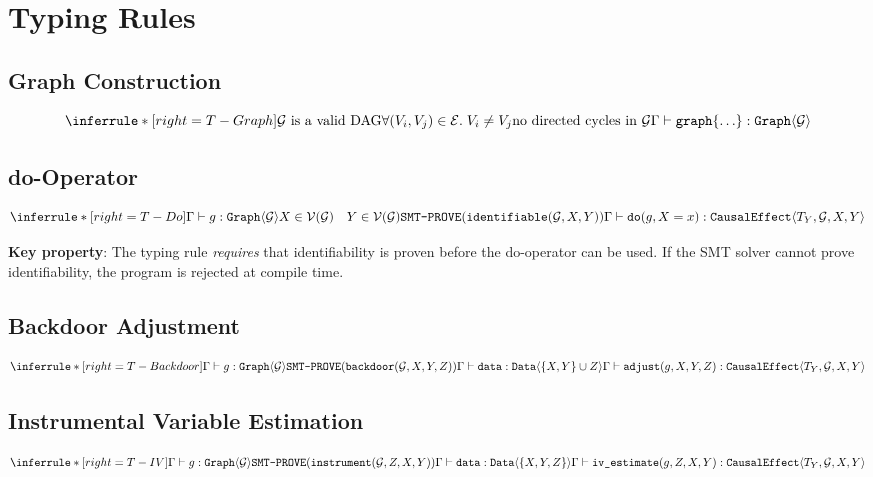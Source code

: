 \documentclass[11pt]{article}
\begin{document}
\section{Typing Rules}

\subsection{Graph Construction}
\[
\inferrule*[right=T-Graph]
  {\mathcal{G} \text{ is a valid DAG} \\
   \forall (V_i, V_j) \in \mathcal{E}.\; V_i \neq V_j \\
   \text{no directed cycles in } \mathcal{G}}
  {\Gamma \vdash \texttt{graph}\{\ldots\} : \texttt{Graph}\langle \mathcal{G} \rangle}
\]

\subsection{do-Operator}
\[
\inferrule*[right=T-Do]
  {\Gamma \vdash g : \texttt{Graph}\langle \mathcal{G} \rangle \\
   X \in \mathcal{V}(\mathcal{G}) \quad Y \in \mathcal{V}(\mathcal{G}) \\
   \texttt{SMT-PROVE}(\texttt{identifiable}(\mathcal{G}, X, Y))}
  {\Gamma \vdash \texttt{do}(g, X = x) : \texttt{CausalEffect}\langle T_Y, \mathcal{G}, X, Y \rangle}
\]

\noindent \textbf{Key property}: The typing rule \emph{requires} that identifiability is proven before the do-operator can be used. If the SMT solver cannot prove identifiability, the program is rejected at compile time.

\subsection{Backdoor Adjustment}
\[
\inferrule*[right=T-Backdoor]
  {\Gamma \vdash g : \texttt{Graph}\langle \mathcal{G} \rangle \\
   \texttt{SMT-PROVE}(\texttt{backdoor}(\mathcal{G}, X, Y, Z)) \\
   \Gamma \vdash \texttt{data} : \texttt{Data}\langle \{X, Y\} \cup Z \rangle}
  {\Gamma \vdash \texttt{adjust}(g, X, Y, Z) : \texttt{CausalEffect}\langle T_Y, \mathcal{G}, X, Y \rangle}
\]

\subsection{Instrumental Variable Estimation}
\[
\inferrule*[right=T-IV]
  {\Gamma \vdash g : \texttt{Graph}\langle \mathcal{G} \rangle \\
   \texttt{SMT-PROVE}(\texttt{instrument}(\mathcal{G}, Z, X, Y)) \\
   \Gamma \vdash \texttt{data} : \texttt{Data}\langle \{X, Y, Z\} \rangle}
  {\Gamma \vdash \texttt{iv\_estimate}(g, Z, X, Y) : \texttt{CausalEffect}\langle T_Y, \mathcal{G}, X, Y \rangle}
\]
\end{document}
